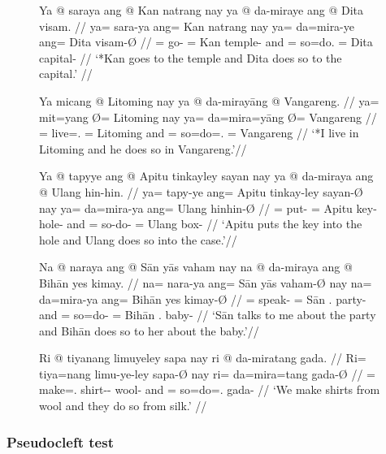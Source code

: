 \begin{figure}
\pex\label{ex:compltrdoso}
\a\label{ex:compltrdoso_1}%
\ljudge*\begingl
	\gla Ya @ saraya ang @ Kan natrang nay ya @ da-miraye ang @ Dita
		visam. //
	\glb ya= sara-ya ang= Kan natrang nay ya= da=mira-ye ang= Dita 
		visam-Ø //
	\glc \LocT{}= go-\TsgM{} \Aarg{}= Kan temple-\Top{} and \LocT{}= 
		so=do.\TsgF{} \Aarg{}= Dita capital-\Top{} //
	\glft `*Kan goes to the temple and Dita does so to the capital.' //
\endgl

\a\label{ex:compltrdoso_2}%
\ljudge*\begingl
	\gla Ya micang {} @ Litoming nay ya @ da-mirayāng {} @ Vangareng. //
	\glb ya= mit=yang Ø= Litoming nay ya= da=mira=yāng Ø= Vangareng //
	\glc \LocT{}= live=\Fsg{}.\Aarg{} \Top{}= Litoming and \LocT{}=
		so=do=\TsgM{}.\Aarg{} \Top{}= Vangareng //
	\glft `*I live in Litoming and he does so in Vangareng.'//
\endgl

\a\label{ex:compltrdoso_3}%
\ljudge*\begingl
	\gla Ya @ tapyye ang @ Apitu tinkayley sayan nay ya @ da-miraya ang @ 
		Ulang hin-hin. //
	\glb ya= tapy-ye ang= Apitu tinkay-ley sayan-Ø nay ya= da=mira-ya ang=
		Ulang hin\til{}hin-Ø //
	\glc \LocT{}= put-\TsgF{} \Aarg{}= Apitu key-\PargI{} hole-\Top{} and
		\LocT{}= so-do-\TsgM{} \Aarg{}= Ulang box\til{}\Dim{}-\Top{} //
	\glft `Apitu puts the key into the hole and Ulang does so into the case.'//
\endgl

\a\label{ex:compltrdoso_4}%
\ljudge*\begingl
	\gla Na @ naraya ang @ Sān yās vaham nay na @ da-miraya ang @ Bihān yes
		kimay. //
	\glb na= nara-ya ang= Sān yās vaham-Ø nay na= da=mira-ya ang= Bihān yes
		kimay-Ø //
	\glc \GenT{}= speak-\TsgM{} \Aarg{}= Sān \Fsg{}.\Parg{} party-\Top{}
		and \GenT{}= so=do-\TsgM{} \Aarg{}= Bihān \TsgF{}.\Parg{}
		baby-\Top{} //
	\glft `Sān talks to me about the party and Bihān does so to her about the
		baby.'//
\endgl

\a\label{ex:compltrdoso_5}%
\ljudge*\begingl
	\gla Ri @ tiyanang limuyeley sapa nay ri @ da-miratang gada. //
	\glb Ri= tiya=nang limu-ye-ley sapa-Ø nay ri= da=mira=tang gada-Ø //
	\glc \InsT{}= make=\Fpl{}.\Aarg{} shirt-\Pl{}-\PargI{} wool-\Top{} and
		\InsT{}= so=do=\TplM{}.\Aarg{} gada-\Top{} //
	\glft `We make shirts from wool and they do so from silk.' //
\endgl

\xe
\end{figure}

\subsubsection{Pseudocleft test}

